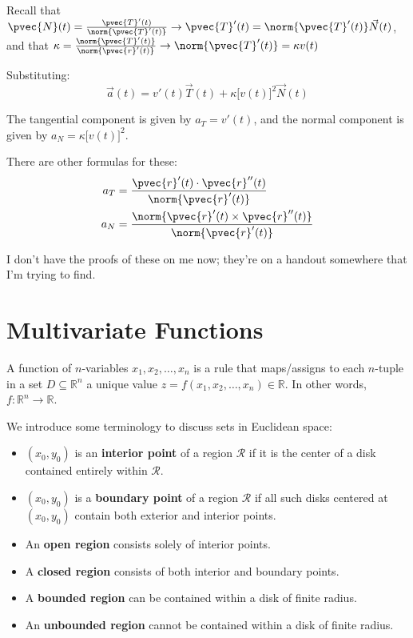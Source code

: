 \documentclass[12pt]{article}
\begin{document}
Recall that $\pvec{N}(t) = \frac{\pvec{T}'(t)}{\norm{\pvec{T}'(t)}} \rightarrow \pvec{T}'(t) = \norm{\pvec{T}'(t)}\vec{N}(t)$, and that $\kappa = \frac{\norm{\pvec{T}'(t)}}{\norm{\pvec{r}'(t)}} \rightarrow \norm{\pvec{T}'(t)} = \kappa v(t)$ 

Substituting: \[ \vec{a}(t) = v'(t)\vec{T}(t) + \kappa{[}v(t){]}^2\vec{N}(t) \]

The tangential component is given by $a_T = v'(t)$, and the normal component is given by $a_N = \kappa{[}v(t){]}^2$. 

There are other formulas for these:
\[
\begin{aligned}
a_T &= \frac{\pvec{r}'(t) \cdot \pvec{r}''(t)}{\norm{\pvec{r}'(t)}} \\
a_N &= \frac{\norm{\pvec{r}'(t) \times \pvec{r}''(t)}}{\norm{\pvec{r}'(t)}}
\end{aligned}
\]

I don't have the proofs of these on me now; they're on a handout somewhere that I'm trying to find.

\section{Multivariate Functions}
A function of $n$-variables $x_1,x_2,\dots,x_n$ is a rule that maps/assigns to each $n$-tuple in a set $D \subseteq \mathbb{R}^n$ a unique value $z = f(x_1,x_2,\dots,x_n) \in \mathbb{R}$. In other words, $f:\mathbb{R}^n \rightarrow \mathbb{R}$.

We introduce some terminology to discuss sets in Euclidean space:
\begin{itemize}
\item $(x_0,y_0)$ is an \textbf{interior point} of a region $\mathcal{R}$ if it is the center of a disk contained entirely within $\mathcal{R}$.
\item $(x_0,y_0)$ is a \textbf{boundary point} of a region $\mathcal{R}$ if all such disks centered at $(x_0,y_0)$ contain both exterior and interior points.
\item An \textbf{open region} consists solely of interior points.
\item A \textbf{closed region} consists of both interior and boundary points.
\item A \textbf{bounded region} can be contained within a disk of finite radius.
\item An \textbf{unbounded region} cannot be contained within a disk of finite radius.
\end{itemize}
\end{document}
